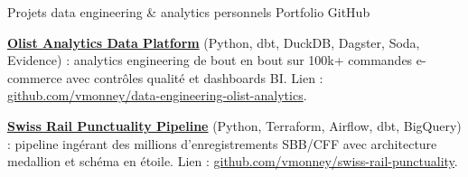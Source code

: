 \begin{cventries}
  \cventry
    {Projets data engineering \& analytics personnels}
    {Portfolio GitHub}
    {}
    {}
    {
      \begin{cvitems}
        \item {\href{https://github.com/vmonney/data-engineering-olist-analytics}{\textbf{Olist Analytics Data Platform}} (Python, dbt, DuckDB, Dagster, Soda, Evidence) : analytics engineering de bout en bout sur 100k+ commandes e-commerce avec contrôles qualité et dashboards BI. Lien : \href{https://github.com/vmonney/data-engineering-olist-analytics}{\textcolor{awesome-red}{github.com/vmonney/data-engineering-olist-analytics}}.}
        \item {\href{https://github.com/vmonney/swiss-rail-punctuality}{\textbf{Swiss Rail Punctuality Pipeline}} (Python, Terraform, Airflow, dbt, BigQuery) : pipeline ingérant des millions d'enregistrements SBB/CFF avec architecture medallion et schéma en étoile. Lien : \href{https://github.com/vmonney/swiss-rail-punctuality}{\textcolor{awesome-red}{github.com/vmonney/swiss-rail-punctuality}}.}
      \end{cvitems}
    }
\end{cventries}

